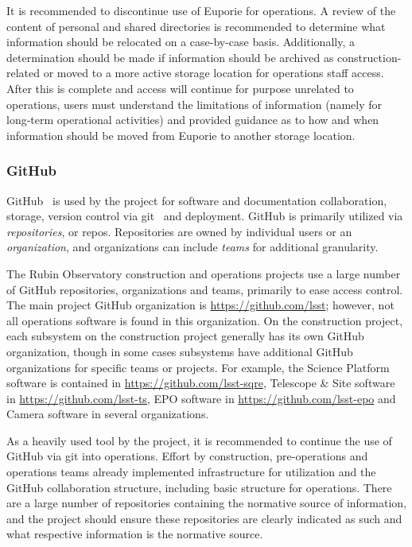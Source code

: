 It is recommended to discontinue use of Euporie for operations.
A review of the content of personal and shared directories is recommended to determine what information should be relocated on a case-by-case basis.
Additionally, a determination should be made if information should be archived as construction-related or moved to a more active storage location for operations staff access.
After this is complete and access will continue for purpose unrelated to operations, users must understand the limitations of information (namely for long-term operational activities) and provided guidance as to how and when information should be moved from Euporie to another storage location.

\subsubsection{GitHub}

GitHub\texttrademark\ \citep{GitHub-cite} is used by the project for software and documentation collaboration, storage, version control via git\texttrademark\ \citep{git-cite} and deployment.
GitHub is primarily utilized via \emph{repositories}, or repos.
Repositories are owned by individual users or an \emph{organization}, and organizations can include \emph{teams} for additional granularity.

The Rubin Observatory construction and operations projects use a large number of GitHub repositories, organizations and teams, primarily to ease access control.
The main project GitHub organization is \url{https://github.com/lsst}; however, not all operations software is found in this organization.
On the construction project, each subsystem on the construction project generally has its own GitHub organization, though in some cases subsystems have additional GitHub organizations for specific teams or projects.
For example, the Science Platform software is contained in \url{https://github.com/lsst-sqre}, Telescope \& Site software in \url{https://github.com/lsst-ts}, EPO software in \url{https://github.com/lsst-epo} and Camera software in several organizations.

As a heavily used tool by the project, it is recommended to continue the use of GitHub via git into operations.
Effort by construction, pre-operations and operations teams already implemented infrastructure for utilization and the GitHub collaboration structure, including basic structure for operations.
There are a large number of repositories containing the normative source of information, and the project should ensure these repositories are clearly indicated as such and what respective information is the normative source.

